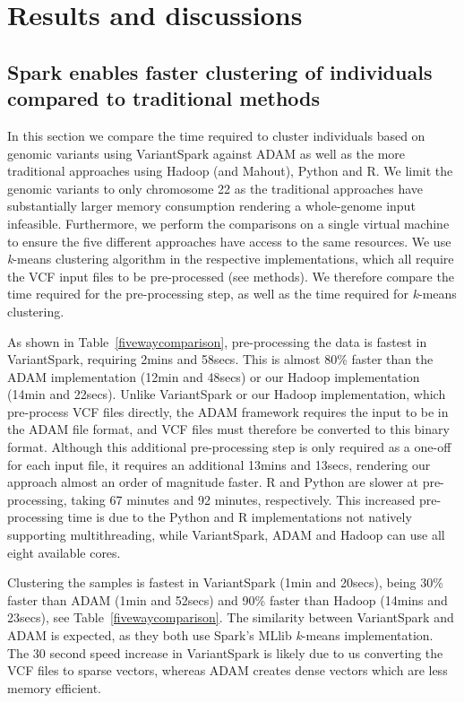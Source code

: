 \documentclass{bmcart}
\newcommand{\variantSpark}{{\sc VariantSpark}}
\newcommand{\kMeans}{\textit{k}-means}
\begin{document}
\section*{Results and discussions}

\subsection*{{\sc Spark} enables faster clustering of individuals compared to traditional methods}

In this section we compare the time required to cluster individuals based on genomic variants using \variantSpark{} against ADAM as well as the more traditional approaches using Hadoop (and Mahout), Python and R. 
We limit the genomic variants to only chromosome 22 as the traditional approaches have substantially larger memory consumption rendering a whole-genome input infeasible.  
Furthermore, we perform the comparisons on a single virtual machine to ensure the five different approaches have access to the same resources.
We use \kMeans{} clustering algorithm in the respective implementations, which all require the VCF input files to be pre-processed (see methods). 
We therefore compare the time required for the pre-processing step, as well as the time required for \kMeans{} clustering.

As shown in Table~\ref{fivewaycomparison}, pre-processing the data is fastest in \variantSpark{}, requiring 2mins and 58secs. %
This is almost 80\% faster than the ADAM implementation (12min and 48secs) %
or our Hadoop implementation (14min and 22secs). %
Unlike \variantSpark{} or our Hadoop implementation, which pre-process VCF files directly, the ADAM framework requires the input to be in the ADAM file format, and VCF files must therefore be converted to this binary format. 
Although this additional pre-processing step is only required as a one-off for each input file, it requires an additional 13mins and 13secs, %
rendering our approach almost an order of magnitude faster. 
R and Python are slower at pre-processing, taking 67 minutes and 92 minutes, respectively. This increased pre-processing time is due to the Python and R implementations not natively supporting multithreading, while \variantSpark{}, ADAM and Hadoop can use all eight available cores.

Clustering the samples is fastest in \variantSpark{} (1min and 20secs), being 30\% faster than ADAM (1min and 52secs) and  %
90\% faster than Hadoop (14mins and 23secs), see Table~\ref{fivewaycomparison}.
The similarity between \variantSpark{} and ADAM is expected, as they both use {\sc Spark}'s MLlib \kMeans{} implementation. 
The 30 second speed increase in \variantSpark{} is likely due to us converting the VCF files to sparse vectors, whereas ADAM creates dense vectors which are less memory efficient.
\end{document}
